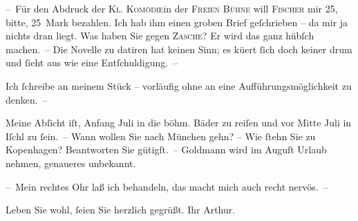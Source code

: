 \pstart
           – Für den Abdruck der \textsc{Kl. Komödie}in der \textsc{Freien Bühne} will \textsc{Fischer} mir 25, bitte, 25 Mark bezahlen. Ich hab ihm einen groben Brief geſchrieben –
               da mir ja nichts dran liegt. Was haben Sie gegen \textsc{Zasche}? Er wird das ganz hübſch machen. – Die Novelle zu datiren hat keinen Sinn; es kü{\geminationm}ert ſich doch keiner drum und ſieht aus wie eine
               Entſchuldigung. –\pend
           
\pstart
           Ich ſchreibe an meinem Stück –
               vorläufig ohne an eine Aufführungs{\pb}möglichkeit zu
               denken. –\pend
           
\pstart
           Meine Abſicht iſt, Anfang Juli in die böhm. Bäder zu reiſen und vor Mitte Juli in Iſchl zu ſein. – Wann wollen Sie nach München gehn? – Wie ſtehn Sie zu Kopenhagen? Beantworten Sie gütigſt. – Goldmann wird im Auguſt Urlaub nehmen, genaueres
               unbekannt.\pend
           
\pstart
           – Mein rechtes Ohr laß ich behandeln, das macht mich auch recht nervös. –\pend
           
\pstart
           Leben Sie wohl, ſeien Sie herzlich gegrüßt.\pend
           \pstart Ihr \spacefill\mbox{Arthur.}\pend{}\endnumbering{}  
      